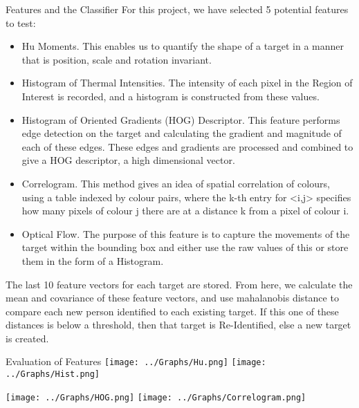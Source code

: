\documentclass[final]{beamer}
\begin{document}
\begin{frame}{}
\begin{columns}[t]
\begin{column}{.49\linewidth}
        \begin{block}{Features and the Classifier}
        For this project, we have selected 5 potential features to test:
          \begin{itemize}
          \item Hu Moments. 
          This enables us to quantify the shape of a target in a manner that is position, scale and rotation invariant.
          \item Histogram of Thermal Intensities. 
          The intensity of each pixel in the Region of Interest is recorded, and a histogram is constructed from these values.
          \item Histogram of Oriented Gradients (HOG) Descriptor. 
          This feature performs edge detection on the target and calculating the gradient and magnitude of each of these edges. These edges and gradients are processed and combined to give a HOG descriptor, a high dimensional vector. 
          \item Correlogram. 
           This method gives an idea of spatial correlation of colours, using a table indexed by colour pairs, where the k-th entry for <i,j> specifies how many pixels of colour j there are at a distance k from a pixel of colour i.
          \item Optical Flow. 
          The purpose of this feature is to capture the movements of the target within the bounding box and either use the raw values of this or store them in the form of a Histogram.
          \end{itemize}
          The last 10 feature vectors for each target are stored. From here, we calculate the mean and covariance of these feature vectors, and use mahalanobis distance to compare each new person identified to each existing target. If this one of these distances is below a threshold, then that target is Re-Identified, else a new target is created.
        \end{block}
	
        \begin{block}{Evaluation of Features}
        \hspace{1cm}
		\texttt{[image: ../Graphs/Hu.png]}
		\hspace{2cm}
		\texttt{[image: ../Graphs/Hist.png]}
		
		\hspace{1cm}
		\texttt{[image: ../Graphs/HOG.png]}
		\hspace{2cm}
		\texttt{[image: ../Graphs/Correlogram.png]}
		

\end{block}
\end{column}
\end{columns}
\end{frame}
\end{document}
